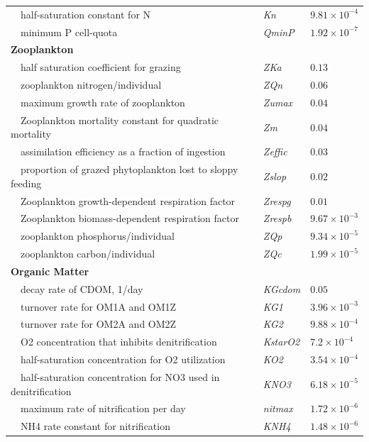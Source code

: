 \documentclass[preprint]{elsarticle}\usepackage[]{graphicx}\usepackage[]{color}
\begin{document}
\begin{table}[!tbp]
{\begin{center}
\begin{tabular}{lll}
~~half-saturation constant for N&\textit{Kn}&$9.81\times 10^{-4}$\tabularnewline
~~minimum P cell-quota&\textit{QminP}&$1.92\times 10^{-7}$\tabularnewline
\hline
{\bfseries Zooplankton}&&\tabularnewline
~~half saturation coefficient for grazing&\textit{ZKa}&$0.13$\tabularnewline
~~zooplankton nitrogen/individual&\textit{ZQn}&$0.06$\tabularnewline
~~maximum growth rate of zooplankton&\textit{Zumax}&$0.04$\tabularnewline
~~Zooplankton mortality constant for quadratic mortality&\textit{Zm}&$0.04$\tabularnewline
~~assimilation efficiency as a fraction of ingestion&\textit{Zeffic}&$0.03$\tabularnewline
~~proportion of grazed phytoplankton lost to sloppy feeding&\textit{Zslop}&$0.02$\tabularnewline
~~Zooplankton growth-dependent respiration factor&\textit{Zrespg}&$0.01$\tabularnewline
~~Zooplankton biomass-dependent respiration factor&\textit{Zrespb}&$9.67\times 10^{-3}$\tabularnewline
~~zooplankton phosphorus/individual&\textit{ZQp}&$9.34\times 10^{-5}$\tabularnewline
~~zooplankton carbon/individual&\textit{ZQc}&$1.99\times 10^{-5}$\tabularnewline
\hline
{\bfseries Organic Matter}&&\tabularnewline
~~decay rate of CDOM, 1/day&\textit{KGcdom}&$0.05$\tabularnewline
~~turnover rate for OM1A and OM1Z&\textit{KG1}&$3.96\times 10^{-3}$\tabularnewline
~~turnover rate for OM2A and OM2Z&\textit{KG2}&$9.88\times 10^{-4}$\tabularnewline
~~O2 concentration that inhibits denitrification&\textit{KstarO2}&$7.2\times 10^{-4}$\tabularnewline
~~half-saturation concentration for O2 utilization&\textit{KO2}&$3.54\times 10^{-4}$\tabularnewline
~~half-saturation concentration for NO3 used in denitrification&\textit{KNO3}&$6.18\times 10^{-5}$\tabularnewline
~~maximum rate of nitrification per day&\textit{nitmax}&$1.72\times 10^{-6}$\tabularnewline
~~NH4 rate constant for nitrification&\textit{KNH4}&$1.48\times 10^{-6}$\tabularnewline
\hline
\end{tabular}\end{center}}
\end{table}
\end{document}
